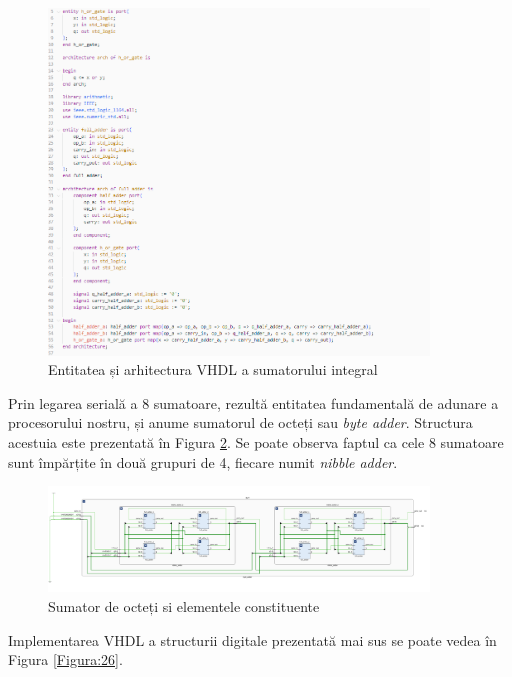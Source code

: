 \documentclass[12pt]{article}
\begin{document}
 \begin{figure}[h!]
 \includegraphics[width=0.9\textwidth]{fulladder.png}
 \centering
 \caption{Entitatea și arhitectura VHDL a sumatorului integral}
 \label{Figura:25}
 \end{figure}

Prin legarea serială a 8 sumatoare, rezultă entitatea fundamentală de adunare a procesorului nostru, și anume sumatorul de octeți sau \textit{byte adder}. Structura acestuia este prezentată în Figura \ref{Figura:17}. Se poate observa faptul ca cele 8 sumatoare sunt împărțite în două grupuri de 4, fiecare numit \textit{nibble adder}.
 \begin{figure}[h!]
 \includegraphics[width=0.9\textwidth]{byteadder.png}
 \centering
 \caption{Sumator de octeți si elementele constituente}
 \label{Figura:17}
 \end{figure}

Implementarea VHDL a structurii digitale prezentată mai sus se poate vedea în Figura \ref{Figura:26}.
\end{document}
